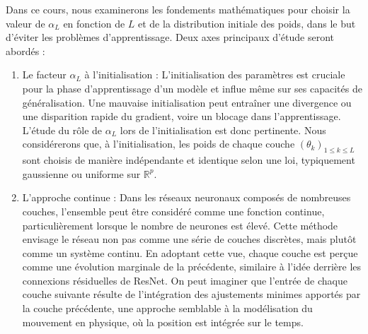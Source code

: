 Dans ce cours, nous examinerons les fondements mathématiques pour choisir la valeur de $\alpha_L$ en fonction de $L$ et de la distribution initiale des poids, dans le but d'éviter les problèmes d'apprentissage. Deux axes principaux d'étude seront abordés :
\begin{enumerate}
    \item Le facteur $\alpha_L$ à l'initialisation : L'initialisation des paramètres est cruciale pour la phase d'apprentissage d'un modèle et influe même sur ses capacités de généralisation. Une mauvaise initialisation peut entraîner une divergence ou une disparition rapide du gradient, voire un blocage dans l'apprentissage. L'étude du rôle de $\alpha_L$ lors de l'initialisation est donc pertinente. Nous considérerons que, à l'initialisation, les poids de chaque couche $(\theta_k)_{1 \leq k \leq L}$ sont choisis de manière indépendante et identique selon une loi, typiquement gaussienne ou uniforme sur $\mathbb{R}^p$. 
    \item L'approche continue : Dans les réseaux neuronaux composés de nombreuses couches, l'ensemble peut être considéré comme une fonction continue, particulièrement lorsque le nombre de neurones est élevé. Cette méthode envisage le réseau non pas comme une série de couches discrètes, mais plutôt comme un système continu. En adoptant cette vue, chaque couche est perçue comme une évolution marginale de la précédente, similaire à l'idée derrière les connexions résiduelles de ResNet. On peut imaginer que l'entrée de chaque couche suivante résulte de l'intégration des ajustements minimes apportés par la couche précédente, une approche semblable à la modélisation du mouvement en physique, où la position est intégrée sur le temps.\\

\end{enumerate}
